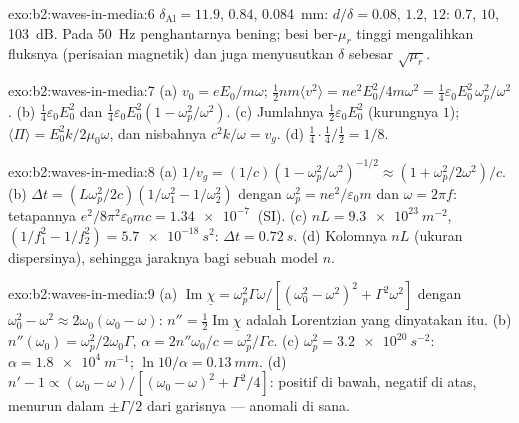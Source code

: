 \begin{solution}{exo:b2:waves-in-media:6}
$\delta_{\text{Al}} = 11.9$, $0.84$, \qty{0.084}{mm}: $d/\delta = 0.08$, $1.2$, $12$: $0.7$,
$10$, \qty{103}{dB}. Pada \qty{50}{Hz} penghantarnya bening; besi ber-$\mu_r$
tinggi mengalihkan fluksnya (perisaian magnetik) dan juga menyusutkan $\delta$ sebesar
$\sqrt{\mu_r}$.
\end{solution}

\begin{solution}{exo:b2:waves-in-media:7}
(a) $v_0 = eE_0/m\omega$; $\tfrac12nm\langle v^2\rangle = ne^2E_0^2/4m\omega^2 = \tfrac14\varepsilon_0
E_0^2\,\omega_p^2/\omega^2$. (b) $\tfrac14\varepsilon_0E_0^2$ dan $\tfrac14\varepsilon_0E_0^2(1 - \omega_p^2/
\omega^2)$. (c) Jumlahnya $\tfrac12\varepsilon_0E_0^2$ (kurungnya $1$); $\langle\Pi
\rangle = E_0^2k/2\mu_0\omega$, dan nisbahnya $c^2k/\omega = v_g$. (d) $\tfrac14\cdot\tfrac14
/\tfrac12 = 1/8$.
\end{solution}

\begin{solution}{exo:b2:waves-in-media:8}
(a) $1/v_g = (1/c)(1 - \omega_p^2/\omega^2)^{-1/2} \approx (1 + \omega_p^2/2\omega^2)/c$. (b) $\Delta t
= (L\omega_p^2/2c)(1/\omega_1^2 - 1/\omega_2^2)$ dengan $\omega_p^2 = ne^2/\varepsilon_0m$ dan $\omega =
2\pi f$: tetapannya $e^2/8\pi^2\varepsilon_0mc = \qty{1.34e-7}{}$ (SI). (c) $nL = \qty{9.3e23}{m^{-2}}$,
$(1/f_1^2 - 1/f_2^2) = \qty{5.7e-18}{s^2}$: $\Delta t = \qty{0.72}{s}$. (d) Kolomnya $nL$
(ukuran dispersinya), sehingga jaraknya bagi sebuah model $n$.
\end{solution}

\begin{solution}{exo:b2:waves-in-media:9}
(a) $\operatorname{Im}\underline\chi = \omega_p^2\Gamma\omega/[(\omega_0^2 - \omega^2)^2 + \Gamma^2\omega^2]$ dengan
$\omega_0^2 - \omega^2 \approx 2\omega_0(\omega_0 - \omega)$: $n'' = \tfrac12\operatorname{Im}\underline\chi$ adalah
Lorentzian yang dinyatakan itu. (b) $n''(\omega_0) = \omega_p^2/2\omega_0\Gamma$, $\alpha = 2n''\omega_0/c =
\omega_p^2/\Gamma c$. (c) $\omega_p^2 = \qty{3.2e20}{s^{-2}}$: $\alpha = \qty{1.8e4}{m^{-1}}$;
$\ln10/\alpha = \qty{0.13}{mm}$. (d) $n' - 1 \propto (\omega_0 - \omega)/[(\omega_0 - \omega)^2 +
\Gamma^2/4]$: positif di bawah, negatif di atas, menurun dalam $\pm\Gamma/2$
dari garisnya --- anomali di sana.
\end{solution}


